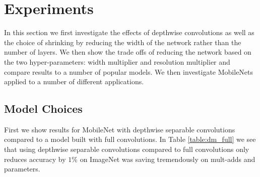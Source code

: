 \documentclass[10pt,twocolumn,letterpaper]{article}
\begin{document}
\begin{table}[t]
  \caption{Resource usage for modifications to standard convolution. Note that each row is a cumulative effect adding on top of the previous row. This example is for an internal MobileNet layer with $D_K=3$, $M=512$, $N=512$, $D_F=14$.} %
\centering %
\end{table}

\section{Experiments} \label{sec:exp}

In this section we first investigate the effects of depthwise convolutions as well as the choice of shrinking by reducing the width of the network rather than the number of layers. We then show the trade offs of reducing the network based on the two hyper-parameters: width multiplier and resolution multiplier and compare results to a number of popular models. We then investigate MobileNets applied to a number of different applications.

\subsection{Model Choices}
First we show results for MobileNet with depthwise separable convolutions compared to a model built with full convolutions. In Table \ref{table:dm_full} we see that using depthwise separable convolutions compared to full convolutions only reduces accuracy by $1\%$ on ImageNet was saving tremendously on mult-adds and parameters.
\end{document}
